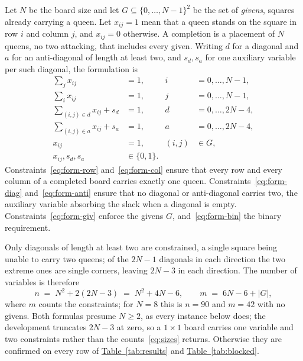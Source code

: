 \documentclass{easychair}
\newcommand{\tabref}[1]{\textcolor{academicpurple}{\hyperref[#1]{Table~\ref*{#1}}}}
\begin{document}
Let $N$ be the board size and let $G \subseteq \{0,\dots,N-1\}^2$ be the set of \emph{givens},
squares already carrying a queen. Let $x_{ij} = 1$ mean that a queen stands on the square in row $i$
and column $j$, and $x_{ij} = 0$ otherwise. A completion is a placement of $N$ queens, no two
attacking, that includes every given. Writing $d$ for a diagonal and $a$ for an anti-diagonal of
length at least two, and $s_d, s_a$ for one auxiliary variable per such diagonal, the formulation is
\begin{subequations}\label{eq:form}
\begin{align}
  \textstyle\sum_{j} x_{ij} &= 1, & i &= 0,\dots,N-1, \label{eq:form-row}\\
  \textstyle\sum_{i} x_{ij} &= 1, & j &= 0,\dots,N-1, \label{eq:form-col}\\
  \textstyle\sum_{(i,j)\in d} x_{ij} + s_d &= 1, & d &= 0,\dots,2N-4, \label{eq:form-diag}\\
  \textstyle\sum_{(i,j)\in a} x_{ij} + s_a &= 1, & a &= 0,\dots,2N-4, \label{eq:form-anti}\\
  x_{ij} &= 1, & (i,j) &\in G, \label{eq:form-giv}\\
  x_{ij}, s_d, s_a &\in \{0,1\}. & & \label{eq:form-bin}
\end{align}
\end{subequations}
Constraints~\eqref{eq:form-row} and~\eqref{eq:form-col} ensure that every row and every column of a
completed board carries exactly one queen. Constraints~\eqref{eq:form-diag}
and~\eqref{eq:form-anti} ensure that no diagonal or anti-diagonal carries two, the auxiliary
variable absorbing the slack when a diagonal is empty. Constraints~\eqref{eq:form-giv} enforce the
givens $G$, and~\eqref{eq:form-bin} the binary requirement.

Only diagonals of length at least two are constrained, a single square being unable to carry two
queens; of the $2N-1$ diagonals in each direction the two extreme ones are single corners, leaving
$2N-3$ in each direction. The number of variables is therefore
\begin{equation}\label{eq:sizes}
  n \;=\; N^2 + 2(2N-3) \;=\; N^2 + 4N - 6 ,
  \qquad
  m \;=\; 6N - 6 + |G| ,
\end{equation}
where $m$ counts the constraints; for $N = 8$ this is $n = 90$ and $m = 42$ with no givens. Both
formulas presume $N \ge 2$, as every instance below does; the development truncates $2N-3$ at zero, so
a $1\times1$ board carries one variable and two constraints rather than the counts~\eqref{eq:sizes}
returns. Otherwise they are confirmed on every row of \tabref{tab:results} and
\tabref{tab:blocked}.
\end{document}
